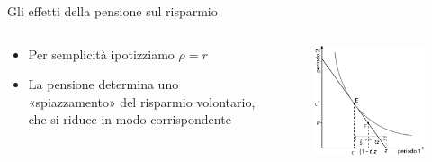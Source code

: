 \documentclass[11pt]{beamer}
\begin{document}
\begin{frame}{Gli effetti della pensione sul risparmio}
\begin{columns}
\begin{column}{.5\columnwidth}
\begin{itemize}
\item Per semplicità ipotizziamo \(\rho=r\)
\item La pensione determina uno «spiazzamento» del risparmio volontario, che si riduce in modo corrispondente
\end{itemize}
\end{column}

\begin{column}{.5\columnwidth}
\begin{figure}[htbp]
\centering
\includegraphics[width=\textwidth]{./figure/effetti-sul-risparmio-2.pdf}
\end{figure}
\end{column}
\end{columns}
\end{frame}
\end{document}
